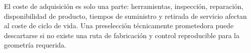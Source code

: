 El coste de adquisición es solo una parte: herramientas, inspección, reparación, disponibilidad de producto, tiempos de suministro y retirada de servicio afectan al coste de ciclo de vida. Una preselección técnicamente prometedora puede descartarse si no existe una ruta de fabricación y control reproducible para la geometría requerida.
